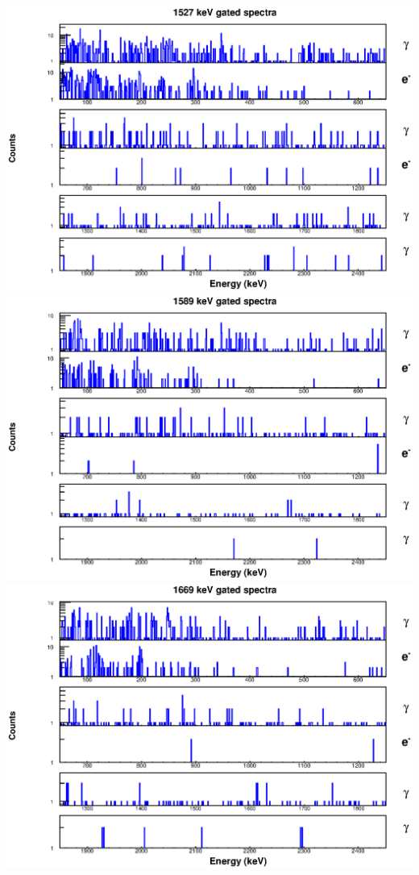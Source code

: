 \includegraphics[scale=0.8]{154Gd_Appendix/1527_combined.eps}
\includegraphics[scale=0.8]{154Gd_Appendix/1589_combined.eps}
\includegraphics[scale=0.8]{154Gd_Appendix/1669_combined.eps}
